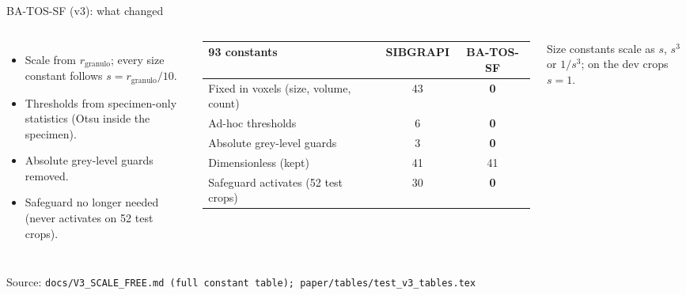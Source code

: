 \documentclass[aspectratio=169]{beamer}
\newcommand{\SF}{BA-TOS-SF}
\newcommand{\src}[1]{\par\vfill{\tiny\color{gray}Source: \texttt{#1}}}
\begin{document}
\begin{frame}{\SF{} (v3): what changed}
\begin{columns}[T,onlytextwidth]
\begin{itemize}
  \item Scale from $r_\mathrm{granulo}$; every size constant follows $s = r_\mathrm{granulo}/10$.
  \item Thresholds from specimen-only statistics (Otsu inside the specimen).
  \item Absolute grey-level guards removed.
  \item Safeguard no longer needed (never activates on 52 test crops).
\end{itemize}
\centering
\footnotesize
\begin{tabular}{lcc}
\toprule
\textbf{93 constants} & \textbf{SIBGRAPI} & \textbf{\SF} \\
\midrule
Fixed in voxels (size, volume, count) & 43 & \textbf{0} \\
Ad-hoc thresholds & 6 & \textbf{0} \\
Absolute grey-level guards & 3 & \textbf{0} \\
Dimensionless (kept) & 41 & 41 \\
\midrule
Safeguard activates (52 test crops) & 30 & \textbf{0} \\
\bottomrule
\end{tabular}

\vspace{0.1cm}
{\scriptsize Size constants scale as $s$, $s^3$ or $1/s^3$; on the dev crops $s=1$.}
\end{columns}
\src{docs/V3\_SCALE\_FREE.md (full constant table); paper/tables/test\_v3\_tables.tex}
\end{frame}
\end{document}
